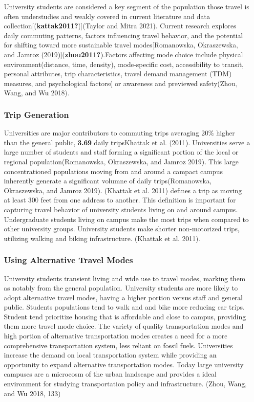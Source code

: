 \documentclass[
  letterpaper,
  DIV=11,
  numbers=noendperiod]{scrartcl}
\begin{document}
University students are considered a key segment of the population those
travel is often understudies and weakly covered in current literature
and data collection{[}(\textbf{kattak2011?}){]}(Taylor and Mitra 2021).
Current research explores daily commuting patterns, factors influencing
travel behavior, and the potential for shifting toward more sustainable
travel modes{[}Romanowska, Okraszewska, and Jamroz
(2019){]}(\textbf{zhou2011?}).Factors affecting mode choice include
physical environment(distance, time, density), mode-specific cost,
accessibility to transit, personal attributes, trip characteristics,
travel demand management (TDM) measures, and psychological factors( or
awareness and previewed safety(Zhou, Wang, and Wu 2018).

\subsubsection{Trip Generation}\label{trip-generation}

Universities are major contributors to commuting trips averaging 20\%
higher than the general public, \textbf{3.69} daily tripsKhattak et al.
(2011). Universities serve a large number of students and staff forming
a significant portion of the local or regional population(Romanowska,
Okraszewska, and Jamroz 2019). This large concentrationed populations
moving from and around a campact campus inherently generate a
significant volumne of daily trips(Romanowska, Okraszewska, and Jamroz
2019). (Khattak et al. 2011) defines a trip as moving at least 300 feet
from one address to another. This definition is important for capturing
travel behavior of university students living on and around campus.
Undergraduate students living on campus make the most trips when
compared to other university groups. University students make shorter
non-motorized trips, utilizing walking and biking infrastructure.
(Khattak et al. 2011).

\subsubsection{Using Alternative Travel
Modes}\label{using-alternative-travel-modes}

University students transient living and wide use to travel modes,
marking them as notably from the general population. University students
are more likely to adopt alternative travel modes, having a higher
portion versus staff and general public. Students populations tend to
walk and and bike more reducing car trips. Student tend prioritize
housing that is affordable and close to campus, providing them more
travel mode choice. The variety of quality transportation modes and high
portion of alternative transportation modes creates a need for a more
comprehensive transportation system, less reliant on fossil fuels.
Universities increase the demand on local transportation system while
providing an opportunity to expand alternative transportation modes.
Today large university campuses are a microcosm of the urban landscape
and provides a ideal environment for studying transportation policy and
infrastructure. (Zhou, Wang, and Wu 2018, 133)
\end{document}
